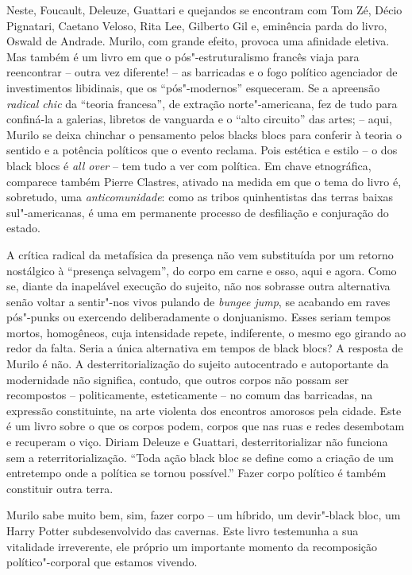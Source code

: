 Neste, Foucault, Deleuze, Guattari e quejandos se encontram com Tom Zé,
Décio Pignatari, Caetano Veloso, Rita Lee, Gilberto Gil e, eminência
parda do livro, Oswald de Andrade. Murilo, com grande efeito, provoca
uma afinidade eletiva. Mas também é um livro em que o pós"-estruturalismo
francês viaja para reencontrar -- outra vez diferente! -- as barricadas
e o fogo político agenciador de investimentos libidinais, que os
``pós"-modernos'' esqueceram. Se a apreensão \emph{radical chic} da
``teoria francesa'', de extração norte"-americana, fez de tudo para
confiná-la a galerias, libretos de vanguarda e o ``alto circuito'' das
artes; -- aqui, Murilo se deixa chinchar o pensamento pelos blacks blocs
para conferir à teoria o sentido e a potência políticos que o evento
reclama. Pois estética e estilo -- o dos black blocs é \emph{all over}
-- tem tudo a ver com política. Em chave etnográfica, comparece também
Pierre Clastres, ativado na medida em que o tema do livro é, sobretudo,
uma \emph{anticomunidade}: como as tribos quinhentistas das terras
baixas sul"-americanas, é uma em permanente processo de desfiliação e
conjuração do estado.

A crítica radical da metafísica da presença não vem substituída por um
retorno nostálgico à ``presença selvagem'', do corpo em carne e osso,
aqui e agora. Como se, diante da inapelável execução do sujeito, não nos
sobrasse outra alternativa senão voltar a sentir"-nos vivos pulando de
\emph{bungee jump}, se acabando em raves pós"-punks ou exercendo
deliberadamente o donjuanismo. Esses seriam tempos mortos, homogêneos,
cuja intensidade repete, indiferente, o mesmo ego girando ao redor da
falta. Seria a única alternativa em tempos de black blocs? A resposta de
Murilo é não. A desterritorialização do sujeito autocentrado e
autoportante da modernidade não significa, contudo, que outros corpos
não possam ser recompostos -- politicamente, esteticamente -- no comum
das barricadas, na expressão constituinte, na arte violenta dos
encontros amorosos pela cidade. Este é um livro sobre o que os corpos
podem, corpos que nas ruas e redes desembotam e recuperam o viço. Diriam
Deleuze e Guattari, desterritorializar não funciona sem a
reterritorialização. ``Toda ação black bloc se define como a criação de
um entretempo onde a política se tornou possível.'' Fazer corpo político
é também constituir outra terra.

Murilo sabe muito bem, sim, fazer corpo -- um híbrido, um devir"-black
bloc, um Harry Potter subdesenvolvido das cavernas. Este livro
testemunha a sua vitalidade irreverente, ele próprio um importante
momento da recomposição político"-corporal que estamos vivendo.



